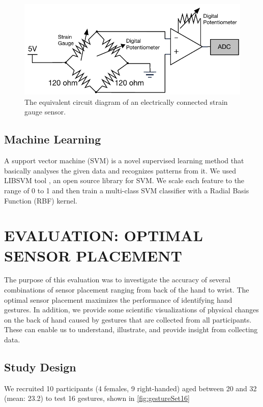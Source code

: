 \documentclass{sigchi}
\begin{document}
\begin{figure}
  \begin{center}
  \includegraphics[width=1\columnwidth]{figures/EquivalentDiagram.pdf}
  \caption{The equivalent circuit diagram of an electrically connected strain gauge sensor.}
  \label{fig:equivalentCircuitDiagram}
  \end{center}
\end{figure}

\subsection{Machine Learning}
A support vector machine (SVM) is a novel supervised learning method that basically analyses the given data and recognizes patterns from it.
We used LIBSVM tool \cite{CC01a}, an open source library for SVM. 
We scale each feature to the range of 0 to 1 and then train a multi-class SVM classifier with a Radial Basis Function (RBF) kernel.

\section{EVALUATION: OPTIMAL SENSOR PLACEMENT}

The purpose of this evaluation was to investigate the accuracy of several combinations of sensor placement ranging from back of the hand to wrist. 
The optimal sensor placement maximizes the performance of identifying hand gestures. %
In addition, we provide some scientific visualizations of physical changes on the back of hand caused by gestures that are collected from all participants. These can enable us to understand, illustrate, and provide insight from collecting data. %

\subsection{Study Design}
We recruited 10 participants (4 females, 9 right-handed) aged between 20 and 32 (mean: 23.2) to test 16 gestures, shown in \autoref{fig:gestureSet16}
\end{document}
